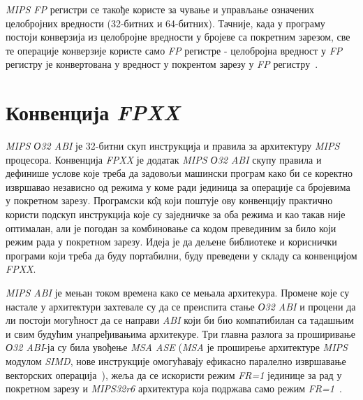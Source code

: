 \documentclass[12pt,oneside]{memoir}
\begin{document}
\indent \textit{MIPS FP} регистри се такође користе за чување и управљање означених целобројних вредности (32-битних и 64-битних). Тачније, када у програму постоји конверзија из целобројне вредности у бројеве са покретним зарезом, све те операције конверзије користе само \textit{FP} регистре - целобројна вредност у  \textit{FP} регистру је конвертована у вредност у покрентом зарезу у  \textit{FP} регистру~\cite{SeeMIPSRun}.

\section{Конвенција \textit{FPXX}}
\label{sec_fpxx}

\indent \textit{MIPS О32 ABI} је 32-битни скуп инструкција и правила за архитектуру \textit{MIPS} процесора. Конвенција \textit{FPXX} је додатак \textit{MIPS О32 ABI} скупу правила и дефинише услове које треба да задовољи машински програм како би се коректно извршавао независно од режима у коме ради јединица за операције са бројевима у покретном зарезу. Програмски к\^{о}д који поштује ову конвенцију практично користи подскуп инструкција које су заједничке за оба режима и као такав није оптималан, али је погодан за комбиновање са кодом превединим за било који режим рада у покретном зарезу. Идеја је да дељене библиотеке и кориснички програми који треба да буду портабилни, буду преведени у складу са конвенцијом \textit{FPXX}.


\indent \textit{MIPS ABI} је мењан током времена како се мењала архитекура. Промене које су настале у архитектури захтевале су да се преиспита стање \textit{О32 ABI} и процени да ли постоји могућност да се направи \textit{ABI} који би био компатибилан са тадашњим и свим будућим унапређивањима архитекуре. Три главна разлога за проширивање \textit{О32 ABI}-ја су била увођење \textit{MSA ASE} (\textit{MSA} је проширење архитектуре \textit{MIPS} модулом \textit{SIMD}, нове инструкције омогућавају ефикасно паралелно извршавање векторских операција~\cite{MSA}), жеља да се искористи режим \textit{FR=1} јединице за рад у покретном зарезу и \textit{MIPS32r6} архитектура која подржава само режим \textit{FR=1}~\cite{fpxxRef}.
\end{document}
